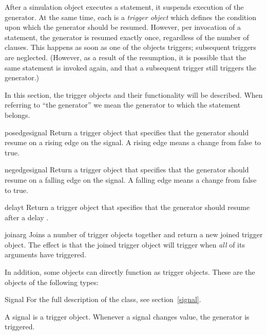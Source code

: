 \hspace{2 cm} 

After a simulation object executes a  statement, it
suspends execution of the generator. At the same time, each
 is a \emph{trigger object} which defines the condition
upon which the generator should be resumed. However, per invocation of a
 statement, the generator is resumed exactly once,
regardless of the number of clauses. This happens as soon as one
of the objects triggers; subsequent triggers are
neglected. (However, as a result of the resumption, it is possible
that the same  statement is invoked again, and that a
subsequent trigger still triggers the generator.)

In this section, the trigger objects and their functionality will be
described. When referring to ``the generator'' we mean the generator
to which the  statement belongs.

\begin{funcdesc}{posedge}{signal}
Return a trigger object that specifies that the generator should
resume on a rising edge on the signal. A rising edge means a change
from false to true.
\end{funcdesc}

\begin{funcdesc}{negedge}{signal}
Return a trigger object that specifies that the generator should
resume on a falling edge on the signal. A falling edge means a change
from false to true.
\end{funcdesc}

\begin{funcdesc}{delay}{t}
Return a trigger object that specifies that the generator should
resume after a delay .
\end{funcdesc}

\begin{funcdesc}{join}{arg }
Joins a number of trigger objects together and return a new joined
trigger object.  The effect is that the joined trigger object will
trigger when \emph{all} of its arguments have triggered.
\end{funcdesc}

In addition, some objects can directly function as trigger
objects. These are the objects of the following types:

\begin{datadesc}{Signal}
For the full description of the  class, see
section~\ref{signal}.

A signal is a trigger object. Whenever a signal changes value, the
generator is triggered.
\end{datadesc}

